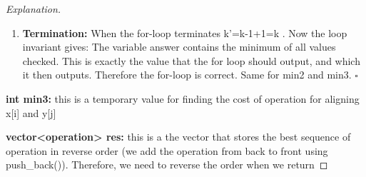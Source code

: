 \documentclass[openany]{article}
\begin{document}
\begin{proof}[Explanation]{}
\begin{enumerate}
        \item[] \textbf{Termination:} When the for-loop terminates  k'=k-1+1=k . Now the loop invariant gives: The variable answer contains the minimum of all values checked. This is exactly the value that the for loop should output, and which it then outputs. Therefore the for-loop is correct. Same for min2 and min3. $\square$
        \end{enumerate}

        \textbf{int min3:} this is a temporary value for finding the cost of operation for aligning x[i] and y[j]
        
        \textbf{vector<operation> res:} this is a the vector that stores the best sequence of operation in reverse order (we add the operation from back to front using push\_back()). Therefore, we need to reverse the order when we return
       
\end{proof}
\end{document}
